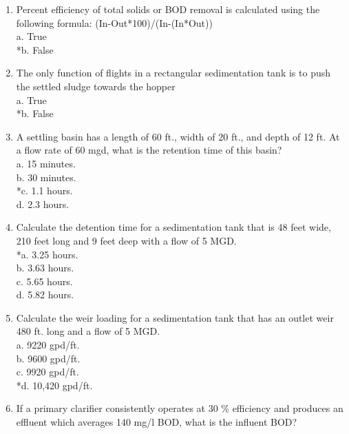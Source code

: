 \begin{enumerate}
\item  Percent efficiency of total solids or BOD removal is calculated using the following formula:  (In-Out*100)/(In-(In*Out))\\

a. True \\
*b. False \\


\item  The only function of flights in a rectangular sedimentation tank is to push the settled sludge towards the hopper\\

a. True \\
*b. False

\item  A settling basin has a length of 60 ft., width of 20 ft., and depth of 12 ft.  At a flow rate of 60 mgd, what is the retention time of this basin? \\

a. 15 minutes. \\
b. 30 minutes. \\
*c. 1.1 hours. \\
d. 2.3 hours. \\


\item  Calculate the detention time for a sedimentation tank that is 48 feet wide, 210 feet long and 9 feet deep with a flow of 5 MGD. \\

*a. 3.25 hours. \\
b. 3.63 hours. \\
c. 5.65 hours. \\
d. 5.82 hours. \\


\item  Calculate the weir loading for a sedimentation tank that has an outlet weir 480 ft. long and a flow of 5 MGD. \\

a. 9220 gpd/ft. \\
b. 9600 gpd/ft. \\
c. 9920 gpd/ft. \\
*d. 10,420 gpd/ft. \\


\item  If a primary clarifier consistently operates at 30 \% efficiency and produces an effluent which averages 140 mg/l BOD, what is the influent BOD? \\


\end{enumerate}
